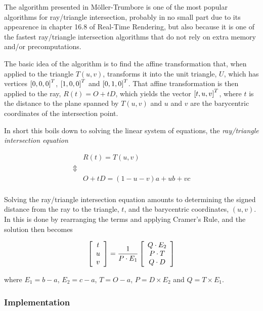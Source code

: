 The algorithm presented in Möller-Trumbore is one of
the most popular algorithms for ray/triangle intersection, probably in no small
part due to its appearence in chapter 16.8 of Real-Time
Rendering, but also because it is one of the fastest ray/triangle
intersection algorithms that do not rely on extra memory and/or precomputations.



The basic idea of the algorithm is to find the affine transformation
that, when applied to the triangle $T(u,v)$, transforms it into the unit
triangle, $U$, which has vertices $\left[0, 0, 0 \right]^T$,
$\left[1, 0, 0 \right]^T$ and $\left[0, 1, 0 \right]^T$. That affine
transformation is then applied to the ray, $R(t) = O + tD$, which
yields the vector $\left[t, u, v \right]^T$, where $t$ is the distance to
the plane spanned by $T(u,v)$ and $u$ and $v$ are the barycentric
coordinates of the intersection point.

In short this boils down to solving the linear system of equations,
the \textit{ray/triangle intersection equation}

\begin{displaymath}
  \begin{array}{rl}
    & R(t) = T(u,v) \\
    \Updownarrow \\
    & O + tD = (1-u-v)a + ub + vc \\
  \end{array}
\end{displaymath}


Solving the ray/triangle intersection equation amounts to determining the signed
distance from the ray to the triangle, $t$, and the barycentric coordinates,
$(u, v)$. In  this is done by rearranging the terms
and applying Cramer's Rule, and the solution then becomes

\begin{displaymath}
  \left[\begin{array}{c} t \\ u \\ v \end{array}\right] = \frac{1}{P \cdot E_1} 
  \left[\begin{array}{c} Q \cdot E_2 \\ P \cdot T \\ Q \cdot D \end{array}\right]
\end{displaymath}

where $E_1 = b - a$, $E_2 = c - a$, $T = O - a$, $P = D \times  E_2$
and $Q = T \times  E_1$.

\subsubsection{Implementation}

